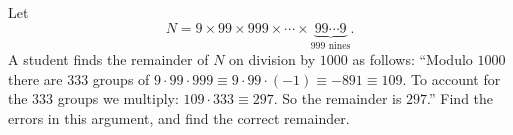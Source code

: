 Let
\[N=9\times99\times999\times\cdots\times\underbrace{99\cdots9}_{999\text{ nines}}.\]
A student finds the remainder of $N$ on division by $1000$ as follows: ``Modulo $1000$ there are $333$ groups of $9\cdot99\cdot999\equiv9\cdot99\cdot(-1)\equiv-891\equiv109$. To account for the $333$ groups we multiply: $109\cdot333\equiv297$. So the remainder is $297$.''
Find the errors in this argument, and find the correct remainder.
